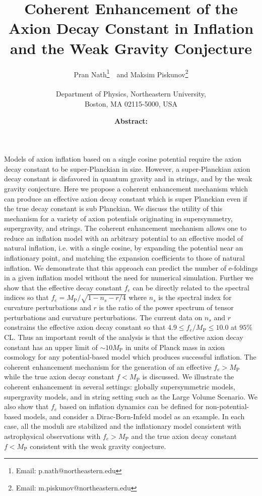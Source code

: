 \documentclass[12pt]{article}
\author{
  Pran Nath\footnote{Email: p.nath@northeastern.edu}~\ and
  Maksim Piskunov\footnote{Email: m.piskunov@northeastern.edu}\\~\\
  Department of Physics, Northeastern University,\\
  Boston, MA 02115-5000, USA
}
\title{
  Coherent Enhancement of the Axion Decay Constant in Inflation and the Weak Gravity Conjecture
}
\begin{document}
\maketitle
\date

\textbf{Abstract:}
Models of axion inflation based on a single cosine potential require the axion decay constant to be super-Planckian in size.
However, a super-Planckian axion decay constant is disfavored in quantum gravity and in strings, and by the weak gravity conjecture.
Here we propose a coherent enhancement mechanism which can produce an effective axion decay constant which is super Planckian even if the true decay constant is sub Planckian.
We discuss the utility of this mechanism for a variety of axion potentials originating in supersymmetry, supergravity, and strings.
The coherent enhancement mechanism allows one to reduce an inflation model with an arbitrary potential to an effective model of natural inflation, i.e. with a single cosine, by expanding the potential near an inflationary point, and matching the expansion coefficients to those of natural inflation.
We demonstrate that this approach can predict the number of e-foldings in a given inflation model without the need for numerical simulation.
Further we show that the effective decay constant $f_e$ can be directly related to the spectral indices so that $f_e = M_\text{P} / \sqrt{1 - n_s - r / 4}$ where $n_s$ is the spectral index for curvature perturbations and $r$ is the ratio of the power spectrum of tensor perturbations and curvature perturbations.
The current data on $n_s$ and $r$ constrains the effective axion decay constant so that $4.9 \leq f_e / M_\text{P} \leq 10.0$ at $95\%$ CL.
Thus an important result of the analysis is that the effective axion decay constant has an upper limit of $\sim 10 M_\text{P}$ in units of Planck mass in axion cosmology for any potential-based model which produces successful inflation.
The coherent enhancement mechanism for the generation of an effective $f_e > M_\text{P}$ while the true axion decay constant $f < M_\text{P}$ is discussed.
We illustrate the coherent enhancement in several settings: globally supersymmetric models, supergravity models, and in string setting such as the Large Volume Scenario.
We also show that $f_e$ based on inflation dynamics can be defined for non-potential-based models, and consider a Dirac-Born-Infeld model as an example.
In each case, all the moduli are stabilized and the inflationary model consistent with astrophysical observations with $f_e > M_\text{P}$ and the true axion decay constant $f < M_\text{P}$ consistent with the weak gravity conjecture.
\newpage
\end{document}
